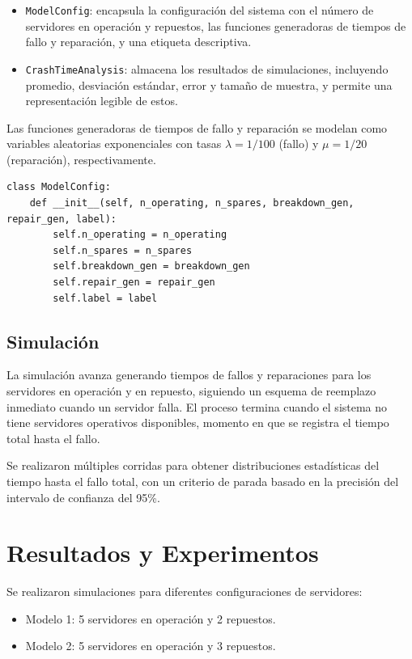 \documentclass{article}
\begin{document}
\begin{itemize}
    \item \texttt{ModelConfig}: encapsula la configuración del sistema con el número de servidores en operación y repuestos, las funciones generadoras de tiempos de fallo y reparación, y una etiqueta descriptiva.
    \item \texttt{CrashTimeAnalysis}: almacena los resultados de simulaciones, incluyendo promedio, desviación estándar, error y tamaño de muestra, y permite una representación legible de estos.
\end{itemize}

Las funciones generadoras de tiempos de fallo y reparación se modelan como variables aleatorias exponenciales con tasas $ \lambda = 1/100 $ (fallo) y $\mu = 1/20$ (reparación), respectivamente.

\begin{lstlisting}[style=python, caption={Definición de configuración del modelo}]
class ModelConfig:
    def __init__(self, n_operating, n_spares, breakdown_gen, repair_gen, label):
        self.n_operating = n_operating
        self.n_spares = n_spares
        self.breakdown_gen = breakdown_gen
        self.repair_gen = repair_gen
        self.label = label
\end{lstlisting}

\subsection{Simulación}
La simulación avanza generando tiempos de fallos y reparaciones para los servidores en operación y en repuesto, siguiendo un esquema de reemplazo inmediato cuando un servidor falla. El proceso termina cuando el sistema no tiene servidores operativos disponibles, momento en que se registra el tiempo total hasta el fallo.

Se realizaron múltiples corridas para obtener distribuciones estadísticas del tiempo hasta el fallo total, con un criterio de parada basado en la precisión del intervalo de confianza del 95\%.

\section{Resultados y Experimentos}
Se realizaron simulaciones para diferentes configuraciones de servidores:

\begin{itemize}
    \item Modelo 1: 5 servidores en operación y 2 repuestos.
    \item Modelo 2: 5 servidores en operación y 3 repuestos.
\end{itemize}
\end{document}
